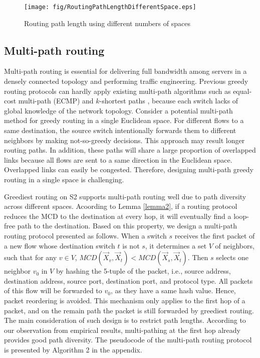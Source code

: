 \documentclass[10pt,conference]{IEEEtran}
\begin{document}
\begin{figure}[tb]
\centering
\texttt{[image: fig/RoutingPathLengthDifferentSpace.eps]}
\caption{\small Routing path length using different numbers of spaces}
\vspace{-2ex}
\label{fig:PathLengthDiffNumSpace}
\vspace{-2.5ex}
\end{figure}


\subsection{Multi-path routing}
Multi-path routing is essential for delivering full bandwidth among servers in a densely connected topology and performing traffic engineering.
Previous greedy routing protocols can hardly apply existing multi-path algorithms such as equal-cost multi-path (ECMP) \cite{ECMP} and $k$-shortest paths \cite{Jellyfish}, because each switch lacks of global knowledge of the network topology. Consider a potential multi-path method for greedy routing in a single Euclidean space.
For different flows to a same destination, the source switch intentionally forwards  them to different neighbors by making not-so-greedy decisions. This approach may result longer routing paths.
In addition, these paths will share a large proportion of overlapped links because all flows are sent to a same direction in the Euclidean space.
Overlapped links can easily be congested. Therefore, designing  multi-path greedy routing in a single space is challenging.

Greediest routing on S2 supports multi-path routing well due to path diversity across different spaces.
Acoording to Lemma \ref{lemma2}, if a routing protocol reduces the MCD to the destination at every hop, it will eventually find a loop-free path to the destination.
Based on this property, we design a multi-path routing protocol presented as follows.
When a switch $s$ receives the first packet of a new flow whose destination switch $t$ is not $s$, it determines a set $V$ of neighbors, such that for any $v \in V$, $MCD(\vec{X}_v, \vec{X}_t) < MCD(\vec{X}_s, \vec{X}_t)$.
Then $s$ selects one neighbor $v_0$ in $V$ by hashing the 5-tuple of the packet, i.e., source address, destination address, source port, destination port, and protocol type.
All packets of this flow will be forwarded to $v_0$, as they have a same hash value.
Hence, packet reordering is avoided.
This mechanism only applies to the first hop of a packet, and on the remain path the packet is still forwarded by greediest routing.
The main consideration of such design is to restrict path lengths.
According to our observation from empirical results, multi-pathing at the first hop already provides good path diversity. The pseudocode of the multi-path routing protocol is presented by Algorithm 2 in the appendix.
\end{document}
